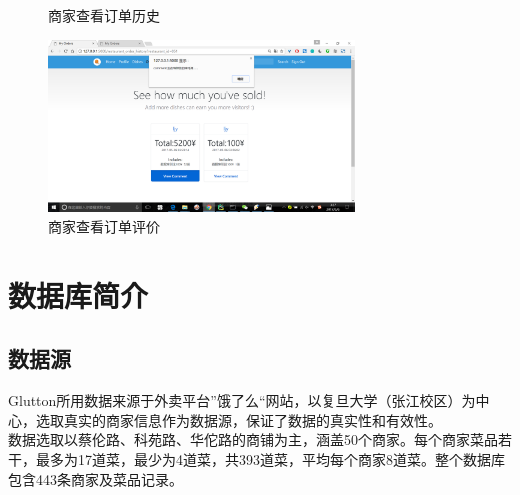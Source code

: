 \documentclass[12pt, oneside,a4paper]{article}
\begin{document}
\begin{itemize}
\begin{figure}[H]
\begin{minipage}[t]{0.5\linewidth}
     \caption{\small{商家查看订单历史}}
   \end{minipage}
   \begin{minipage}[t]{0.5\linewidth}
    \centering
     \includegraphics[width=3.2in]{re-order-comment.jpg}
      \caption{\small{商家查看订单评价}}
   \end{minipage}
   \end{figure} 
  \end{itemize}

\section{数据库简介}
\subsection{数据源}
Glutton所用数据来源于外卖平台”饿了么“网站，以复旦大学（张江校区）为中心，选取真实的商家信息作为数据源，保证了数据的真实性和有效性。\\
数据选取以蔡伦路、科苑路、华佗路的商铺为主，涵盖50个商家。每个商家菜品若干，最多为17道菜，最少为4道菜，共393道菜，平均每个商家8道菜。整个数据库包含443条商家及菜品记录。
\end{document}
